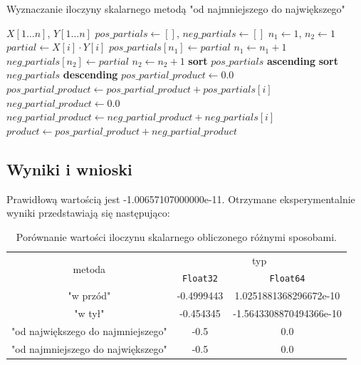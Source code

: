 \documentclass{article}
\begin{document}
\begin{algorithm}
    \caption{Wyznaczanie iloczyny skalarnego metodą "od najmniejszego do największego"}
    \begin{algorithmic}
        \Require $X[1 \dots n]$, $Y[1 \dots n]$
        \State $pos\_partials \gets []$, $neg\_partials \gets []$
        \State $n_1 \gets 1$, $n_2 \gets 1$
            \State $partial \gets X[i] \cdot Y[i]$
                \State $pos\_partials[n_1] \gets partial$
                \State $n_1 \gets n_1 + 1$
            \Else
                \State $neg\_partials[n_2] \gets partial$
                \State $n_2 \gets n_2 + 1$
            \EndIf
        \EndFor
        \State
        \State \textbf{sort} $pos\_partials$ \textbf{ascending}
        \State \textbf{sort} $neg\_partials$ \textbf{descending}
        \State
        \State $pos\_partial\_product \gets 0.0$
            \State $pos\_partial\_product \gets pos\_partial\_product + pos\_partials[i]$
        \EndFor
        \State $neg\_partial\_product \gets 0.0$
            \State $neg\_partial\_product \gets neg\_partial\_product + neg\_partials[i]$
        \EndFor
        \State $product \gets pos\_partial\_product + neg\_partial\_product$
    \end{algorithmic}
\end{algorithm}

\newpage 

\subsection{Wyniki i wnioski}
Prawidłową wartością jest -1.00657107000000e-11. Otrzymane eksperymentalnie wyniki przedstawiają się następująco:

\begin{table}[h!]
    \centering
    \begin{tabular}{|c|c|c|}
    \hline 
    \multirow{2}{*}{metoda} & \multicolumn{2}{|c|}{typ} \\ 
    \cline{2-3}
    & \texttt{Float32} & \texttt{Float64}  \\ 
    \hline 
    "w przód" & -0.4999443 & 1.0251881368296672e-10 \\
    \hline 
    "w tył" & -0.454345 & -1.5643308870494366e-10 \\
    \hline 
    "od największego do najmniejszego" & -0.5 & 0.0 \\
    \hline 
    "od najmniejszego do największego" & -0.5 & 0.0 \\
    \hline
    \end{tabular}
    \caption{Porównanie wartości iloczynu skalarnego obliczonego różnymi sposobami.}
\end{table}
\end{document}
